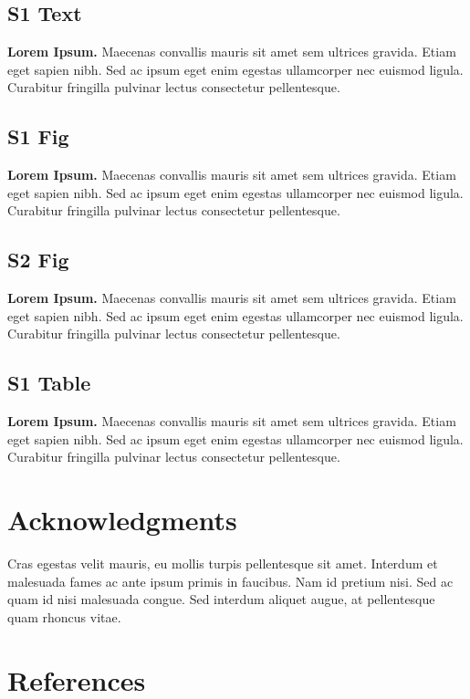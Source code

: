 \documentclass[10pt,letterpaper]{article}
\begin{document}
\subsection*{S1 Text}
\label{S1_Text}
{\bf Lorem Ipsum.} Maecenas convallis mauris sit amet sem ultrices gravida. Etiam eget sapien nibh. Sed ac ipsum eget enim egestas ullamcorper nec euismod ligula. Curabitur fringilla pulvinar lectus consectetur pellentesque.

\subsection*{S1 Fig}
\label{S1_Fig}
{\bf Lorem Ipsum.} Maecenas convallis mauris sit amet sem ultrices gravida. Etiam eget sapien nibh. Sed ac ipsum eget enim egestas ullamcorper nec euismod ligula. Curabitur fringilla pulvinar lectus consectetur pellentesque.

\subsection*{S2 Fig}
\label{S2_Fig}
{\bf Lorem Ipsum.} Maecenas convallis mauris sit amet sem ultrices gravida. Etiam eget sapien nibh. Sed ac ipsum eget enim egestas ullamcorper nec euismod ligula. Curabitur fringilla pulvinar lectus consectetur pellentesque.

\subsection*{S1 Table}
\label{S1_Table}
{\bf Lorem Ipsum.} Maecenas convallis mauris sit amet sem ultrices gravida. Etiam eget sapien nibh. Sed ac ipsum eget enim egestas ullamcorper nec euismod ligula. Curabitur fringilla pulvinar lectus consectetur pellentesque.

\section*{Acknowledgments}
Cras egestas velit mauris, eu mollis turpis pellentesque sit amet. Interdum et malesuada fames ac ante ipsum primis in faucibus. Nam id pretium nisi. Sed ac quam id nisi malesuada congue. Sed interdum aliquet augue, at pellentesque quam rhoncus vitae.

\nolinenumbers

\section*{References}
\end{document}

